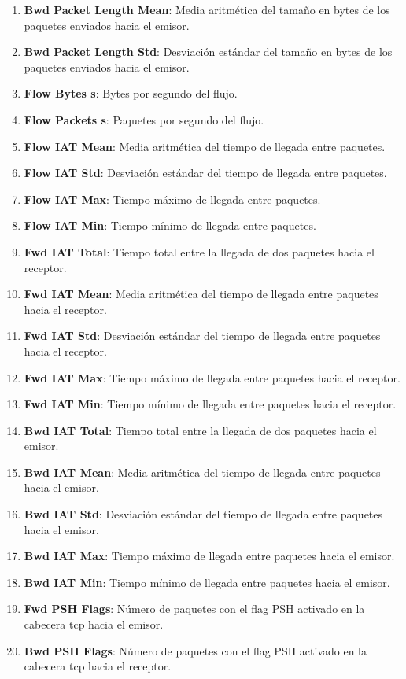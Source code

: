 \begin{enumerate}
    \item \textbf{Bwd Packet Length Mean}: Media aritmética del tamaño en bytes de los paquetes enviados hacia el emisor.
    \item \textbf{Bwd Packet Length Std}: Desviación estándar del tamaño en bytes de los paquetes enviados hacia el emisor.
    \item \textbf{Flow Bytes s}: Bytes por segundo del flujo.
    \item \textbf{Flow Packets s}: Paquetes por segundo del flujo.
    \item \textbf{Flow IAT Mean}: Media aritmética del tiempo de llegada entre paquetes.
    \item \textbf{Flow IAT Std}: Desviación estándar del tiempo de llegada entre paquetes.
    \item \textbf{Flow IAT Max}: Tiempo máximo de llegada entre paquetes.
    \item \textbf{Flow IAT Min}: Tiempo mínimo de llegada entre paquetes.
    \item \textbf{Fwd IAT Total}: Tiempo total entre la llegada de dos paquetes hacia el receptor.
    \item \textbf{Fwd IAT Mean}: Media aritmética del tiempo de llegada entre paquetes hacia el receptor.
    \item \textbf{Fwd IAT Std}: Desviación estándar del tiempo de llegada entre paquetes hacia el receptor.
    \item \textbf{Fwd IAT Max}: Tiempo máximo de llegada entre paquetes hacia el receptor.
    \item \textbf{Fwd IAT Min}: Tiempo mínimo de llegada entre paquetes hacia el receptor.
    \item \textbf{Bwd IAT Total}: Tiempo total entre la llegada de dos paquetes hacia el emisor.
    \item \textbf{Bwd IAT Mean}: Media aritmética del tiempo de llegada entre paquetes hacia el emisor.
    \item \textbf{Bwd IAT Std}: Desviación estándar del tiempo de llegada entre paquetes hacia el emisor.
    \item \textbf{Bwd IAT Max}: Tiempo máximo de llegada entre paquetes hacia el emisor.
    \item \textbf{Bwd IAT Min}: Tiempo mínimo de llegada entre paquetes hacia el emisor.
    \item \textbf{Fwd PSH Flags}: Número de paquetes con el flag PSH activado en la cabecera \acrshort{tcp} hacia el emisor.
    \item \textbf{Bwd PSH Flags}: Número de paquetes con el flag PSH activado en la cabecera \acrshort{tcp} hacia el receptor.

\end{enumerate}
